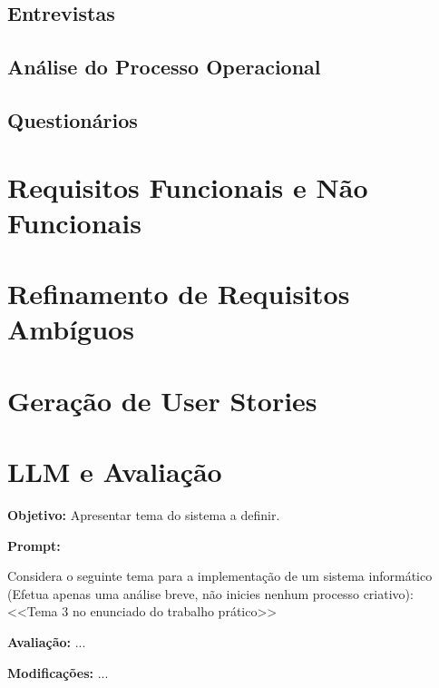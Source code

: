 \documentclass[a4paper,12pt]{scrreprt}
\begin{document}
\subsection{Entrevistas}
\subsection{Análise do Processo Operacional}
\subsection{Questionários}

\section{Requisitos Funcionais e Não Funcionais}

\section{Refinamento de Requisitos Ambíguos}

\section{Geração de User Stories}




\section{LLM e Avaliação}

\begin{tcolorbox}[
	title={Prompt P1 - Apresentação do tema do sistema},
	colback=white,
	colframe=black,
	arc=2mm,
	boxrule=0.5pt
	]
	\textbf{Objetivo:} Apresentar tema do sistema a definir. \par
	\textbf{Prompt:} 
	\begin{tcolorbox}[
		listing only,
		breakable,
		enhanced,
		colback=white,
		colframe=black,
		listing options={
			breaklines=true,
			basicstyle=\ttfamily\small
		}
		]
		Considera o seguinte tema para a implementação de um sistema informático (Efetua apenas uma análise breve, não inicies nenhum processo criativo): <<Tema 3 no enunciado do trabalho prático>>
	\end{tcolorbox}
	\par
	\textbf{Avaliação:} ... \par
	\textbf{Modificações:} ... \par
\end{tcolorbox}
\end{document}
